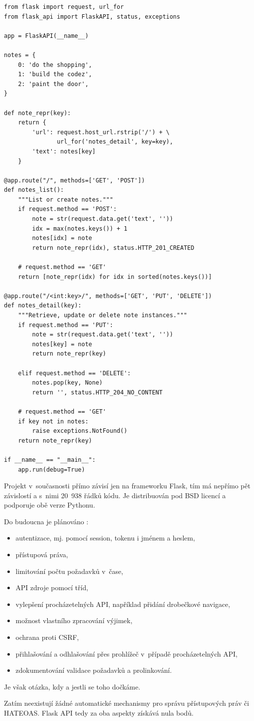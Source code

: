 \begin{listing}[htbp]
\caption{{\label{code:flaskapi}Příklad použití z~dokumentace Flask API \autocite{flaskapigh}}}
\begin{verbatim}
from flask import request, url_for
from flask_api import FlaskAPI, status, exceptions

app = FlaskAPI(__name__)

notes = {
    0: 'do the shopping',
    1: 'build the codez',
    2: 'paint the door',
}

def note_repr(key):
    return {
        'url': request.host_url.rstrip('/') + \
               url_for('notes_detail', key=key),
        'text': notes[key]
    }

@app.route("/", methods=['GET', 'POST'])
def notes_list():
    """List or create notes."""
    if request.method == 'POST':
        note = str(request.data.get('text', ''))
        idx = max(notes.keys()) + 1
        notes[idx] = note
        return note_repr(idx), status.HTTP_201_CREATED

    # request.method == 'GET'
    return [note_repr(idx) for idx in sorted(notes.keys())]

@app.route("/<int:key>/", methods=['GET', 'PUT', 'DELETE'])
def notes_detail(key):
    """Retrieve, update or delete note instances."""
    if request.method == 'PUT':
        note = str(request.data.get('text', ''))
        notes[key] = note
        return note_repr(key)

    elif request.method == 'DELETE':
        notes.pop(key, None)
        return '', status.HTTP_204_NO_CONTENT

    # request.method == 'GET'
    if key not in notes:
        raise exceptions.NotFound()
    return note_repr(key)

if __name__ == "__main__":
    app.run(debug=True)
\end{verbatim}
\end{listing}

Projekt v~současnosti přímo závisí jen na frameworku Flask, tím má nepřímo pět závislostí a s~nimi 20~938 řádků kódu. Je distribuován pod BSD licencí \autocite{BSD2} a podporuje obě verze Pythonu.

Do budoucna je plánováno \autocite{flaskapi}\autocite{flaskapigh}:

\begin{itemize}
\tightlist
\item
  autentizace, mj. pomocí session, tokenu i jménem a heslem,
\item
  přístupová práva,
\item
  limitování počtu požadavků v~čase,
\item
  API zdroje pomocí tříd,
\item
  vylepšení procházetelných API, například přidání drobečkové navigace,
\item
  možnost vlastního zpracování výjimek,
\item
  ochrana proti CSRF,
\item
  přihlašování a odhlašování přes prohlížeč v~případě procházetelných API,
\item
  zdokumentování validace požadavků a prolinkování.
\end{itemize}

Je však otázka, kdy a jestli se toho dočkáme.

Zatím neexistují žádné automatické mechanismy pro správu přístupových práv či HATEOAS. Flask API tedy za oba aspekty získává nula bodů.
